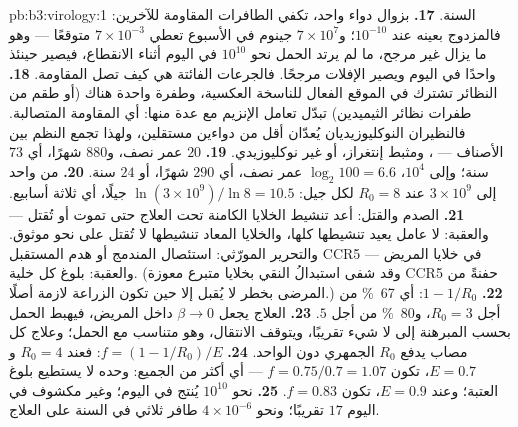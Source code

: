 \begin{solution}{pb:b3:virology:1}
السنة.
\textbf{17.} بزوال دواء واحد، تكفي الطافرات المقاومة للآخرين:
فالمزدوج بعينه عند $10^{-10}$؛ و$7\times 10^{7}$ جينوم في
الأسبوع تعطي $7\times 10^{-3}$ متوقعًا --- وهو ما يزال غير مرجح، ما لم
يرتد الحمل نحو $10^{10}$ في اليوم أثناء الانقطاع، فيصير حينئذ
واحدًا في اليوم ويصير الإفلات مرجحًا. فالجرعات الفائتة هي كيف تصل المقاومة.
\textbf{18.} النظائر تشترك في الموقع الفعال للناسخة العكسية،
وطفرة واحدة هناك (أو طقم من طفرات نظائر الثيميدين) تبدّل
تعامل الإنزيم مع عدة منها: أي المقاومة المتصالبة. فالنظيران
النوكليوزيديان يُعدّان أقل من دواءين مستقلين، ولهذا تجمع النظم
بين الأصناف --- ، ومثبط إنتغراز، 
أو غير نوكليوزيدي.
\textbf{19.} $20$ عمر نصف، و$880$ شهرًا، أي $73$ سنة؛ وإلى $10^{4}$،
$\log_{2}100 = 6.6$ عمر نصف، أي $290$ شهرًا، أو $24$ سنة.
\textbf{20.} من  واحد إلى $3\times 10^{9}$ عند $R_{0} = 8$ لكل
جيل: $\ln(3\times 10^{9})/\ln 8 = 10.5$ جيلًا، أي ثلاثة أسابيع.
\textbf{21.} الصدم والقتل: أعد تنشيط الخلايا الكامنة تحت العلاج حتى
تموت أو تُقتل --- والعقبة: لا عامل يعيد تنشيطها
كلها، والخلايا المعاد تنشيطها لا تُقتل على نحو موثوق. والتحرير المورّثي:
استئصال  المندمج أو هدم المستقبل CCR5 في خلايا
المريض --- والعقبة: بلوغ كل خلية. (وقد شفى استبدالُ النقي بخلايا
متبرع معوزة CCR5 حفنةً من المرضى بخطر لا يُقبل
إلا حين تكون الزراعة لازمة أصلًا.)
\textbf{22.} $1 - 1/R_{0}$: أي \qty{67}{\%} من أجل $R_{0} = 3$، و\qty{80}{\%} من أجل
$5$.
\textbf{23.} العلاج يجعل $\beta \to 0$ داخل المريض، فيهبط الحمل
بحسب المبرهنة إلى لا شيء تقريبًا، ويتوقف الانتقال، وهو
متناسب مع الحمل؛ وعلاج كل مصاب يدفع $R_{0}$ الجمهري
دون الواحد.
\textbf{24.} $f = (1 - 1/R_{0})/E$: فعند $R_{0} = 4$ و$E = 0.7$، تكون $f =
0.75/0.7 = 1.07$ --- أي أكثر من الجميع:  وحده لا يستطيع بلوغ
العتبة؛ وعند $E = 0.9$، تكون $f = 0.83$.
\textbf{25.} نحو $10^{10}$  يُنتج في اليوم؛ وغير مكشوف في
اليوم $17$ تقريبًا؛ ونحو $4\times 10^{-6}$ طافر ثلاثي في السنة على العلاج.
\end{solution}
